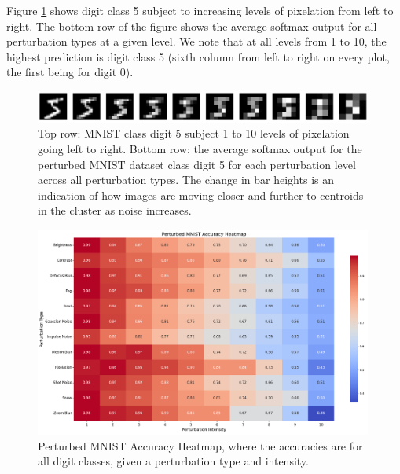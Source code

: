 Figure \ref{fig:Pixelation_Digit_5_images_histogramsx10_plus_softmax} shows digit class 5 subject to increasing levels of pixelation from left to right. The bottom row of the figure shows the average softmax output for all perturbation types at a given level. We note that at all levels from 1 to 10, the highest prediction is digit class 5 (sixth column from left to right on every plot, the first being for digit 0).
\begin{figure}[h!]
    \centering
    \includegraphics[width=0.99\textwidth]{Figures/Results/Figures_Pixelation_Digit_5_images_histogramsx10_plus_softmax.png}   %
    \caption{Top row: MNIST class digit 5 subject 1 to 10 levels of pixelation going left to right. Bottom row: the average softmax output for the perturbed MNIST dataset class digit 5 for each perturbation level across all perturbation types. The change in bar heights is an indication of how images are moving closer and further to centroids in the cluster as noise increases.}\label{fig:Pixelation_Digit_5_images_histogramsx10_plus_softmax}
\end{figure}

\begin{figure}[h!]
    \centering
    \includegraphics[width=0.99\textwidth]{Figures/Results/Figures_PerturbedMNISTAccuracyHeatmap.png}   %
    \caption{Perturbed MNIST Accuracy Heatmap, where the accuracies are for all digit classes, given a perturbation type and intensity.}
    \label{fig:PerturbedMNISTAccuracyHeatmap}
\end{figure}

